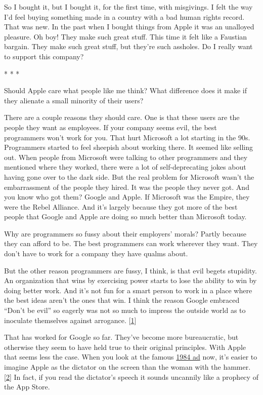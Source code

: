So I bought it, but I bought it, for the first time, with misgivings. I
felt the way I'd feel buying something made in a country with a bad
human rights record. That was new. In the past when I bought things from
Apple it was an unalloyed pleasure. Oh boy! They make such great stuff.
This time it felt like a Faustian bargain. They make such great stuff,
but they're such assholes. Do I really want to support this company?

* * *

Should Apple care what people like me think? What difference does it
make if they alienate a small minority of their users?

There are a couple reasons they should care. One is that these users are
the people they want as employees. If your company seems evil, the best
programmers won't work for you. That hurt Microsoft a lot starting in
the 90s. Programmers started to feel sheepish about working there. It
seemed like selling out. When people from Microsoft were talking to
other programmers and they mentioned where they worked, there were a lot
of self-deprecating jokes about having gone over to the dark side. But
the real problem for Microsoft wasn't the embarrassment of the people
they hired. It was the people they never got. And you know who got them?
Google and Apple. If Microsoft was the Empire, they were the Rebel
Alliance. And it's largely because they got more of the best people that
Google and Apple are doing so much better than Microsoft today.

Why are programmers so fussy about their employers' morals? Partly
because they can afford to be. The best programmers can work wherever
they want. They don't have to work for a company they have qualms about.

But the other reason programmers are fussy, I think, is that evil begets
stupidity. An organization that wins by exercising power starts to lose
the ability to win by doing better work. And it's not fun for a smart
person to work in a place where the best ideas aren't the ones that win.
I think the reason Google embraced ``Don't be evil'' so eagerly was not
so much to impress the outside world as to inoculate themselves against
arrogance. {[}\hyperref[f1n]{1}{]}

That has worked for Google so far. They've become more bureaucratic, but
otherwise they seem to have held true to their original principles. With
Apple that seems less the case. When you look at the famous
\href{http://www.uriahcarpenter.info/1984.html}{1984 ad} now, it's
easier to imagine Apple as the dictator on the screen than the woman
with the hammer. {[}\hyperref[f2n]{2}{]} In fact, if you read the
dictator's speech it sounds uncannily like a prophecy of the App Store.

